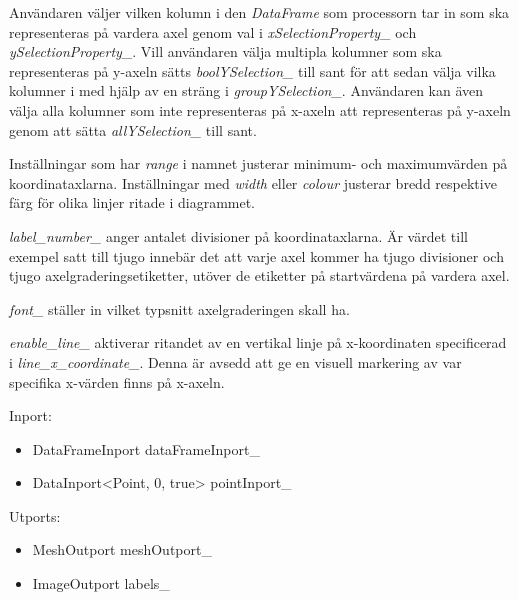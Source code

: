 Användaren väljer vilken kolumn i den \emph{DataFrame} som processorn tar in som ska representeras på vardera axel genom val i \textit{xSelectionProperty\_} och \textit{ySelectionProperty\_}. Vill användaren välja multipla kolumner som ska representeras på y-axeln sätts \textit{boolYSelection\_} till sant för att sedan välja vilka kolumner i med hjälp av en sträng i \textit{groupYSelection\_}. Användaren kan även välja alla kolumner som inte representeras på x-axeln att representeras på y-axeln genom att sätta \textit{allYSelection\_} till sant.

Inställningar som har \emph{range} i namnet justerar minimum- och
maximumvärden på koordinataxlarna. Inställningar med \emph{width}
eller \emph{colour} justerar bredd respektive färg för olika linjer ritade i diagrammet.

\emph{label\_number\_} anger antalet divisioner på koordinataxlarna. Är värdet till exempel satt till tjugo innebär det att varje axel kommer ha tjugo divisioner och tjugo axelgraderingsetiketter, utöver de etiketter på startvärdena på vardera axel.

\emph{font\_} ställer in vilket typsnitt axelgraderingen skall ha.

\emph{enable\_line\_} aktiverar ritandet av en vertikal linje på
x-koordinaten specificerad i \emph{line\_x\_coordinate\_}. Denna är avsedd att ge en visuell markering av var specifika x-värden finns på x-axeln.

\newpage

Inport:
\begin{itemize}
    \setlength\itemsep{0em}
    \item DataFrameInport dataFrameInport\_
    \item DataInport<Point, 0, true> pointInport\_
\end{itemize}

Utports:
\begin{itemize}
    \setlength\itemsep{0em}
    \item MeshOutport meshOutport\_
    \item ImageOutport labels\_
\end{itemize}

